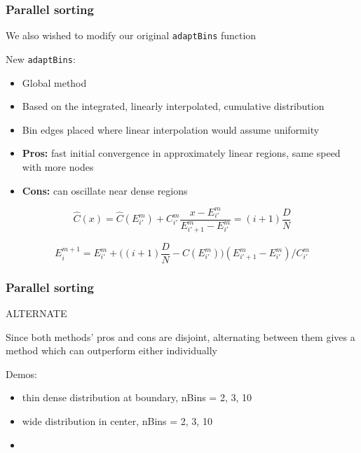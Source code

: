 \documentclass[usernames,dvipsnames]{beamer}
\begin{document}
\begin{frame}
	\frametitle{Parallel sorting}
	
	We also wished to modify our original \texttt{adaptBins} function
	
	
	\begin{block}{New \texttt{adaptBins}:}
		\begin{itemize}
			\item Global method
			\item Based on the integrated, linearly interpolated, cumulative distribution
			\item Bin edges placed where linear interpolation would assume uniformity
			\item \textbf{Pros:} fast initial convergence in approximately linear regions, same speed with more nodes
			\item \textbf{Cons:} can oscillate near dense regions
		\end{itemize}
	\end{block}
	
	\vspace{-5pt}
	
	\begin{equation}
		\hat C(x) = \hat C(E^m_{i'}) + C^m_{i'} \dfrac{x - E^m_{i'}}{E^m_{{i'}+1} - E^m_{i'}} = (i+1) \dfrac{D}{N}
	\end{equation}
	
	\begin{equation}
		E^{m+1}_i = E^m_{i'} + \Big( (i+1) \dfrac{D}{N} - C(E^m_{i'}) \Big) (E^m_{{i'}+1} - E^m_{i'}) / C^m_{i'}
	\end{equation}
	
\end{frame}

\begin{frame}
	\frametitle{Parallel sorting}
	
	ALTERNATE
	
	Since both methods' pros and cons are disjoint, alternating between them gives a method which can outperform either individually
	
	\begin{block}{Demos:}

		\begin{itemize}
			\item thin dense distribution at boundary, nBins = 2, 3, 10
			\item wide distribution in center, nBins = 2, 3, 10
			\item 
		\end{itemize}

	\end{block}
	
	
\end{frame}
\end{document}
